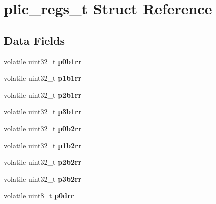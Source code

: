 \hypertarget{structplic__regs__t}{}\section{plic\+\_\+regs\+\_\+t Struct Reference}
\label{structplic__regs__t}
\subsection*{Data Fields}
\begin{DoxyCompactItemize}
\item 
\mbox{\label{structplic__regs__t_a11d0ebf6bcd208dee8c30186bed33289}} 
volatile uint32\+\_\+t {\bfseries p0b1rr}
\item 
\mbox{\label{structplic__regs__t_a218e6951e9af991fe6098fc0c5afd7f4}} 
volatile uint32\+\_\+t {\bfseries p1b1rr}
\item 
\mbox{\label{structplic__regs__t_afec47c1e18ef40f12915c30068b826e4}} 
volatile uint32\+\_\+t {\bfseries p2b1rr}
\item 
\mbox{\label{structplic__regs__t_ad572b292f64dbbf6ea5e4b2eacaf1780}} 
volatile uint32\+\_\+t {\bfseries p3b1rr}
\item 
\mbox{\label{structplic__regs__t_a80457071a6bdd95bf8012cc06993a74d}} 
volatile uint32\+\_\+t {\bfseries p0b2rr}
\item 
\mbox{\label{structplic__regs__t_a0aff89aef198ae55b5f23b808d134930}} 
volatile uint32\+\_\+t {\bfseries p1b2rr}
\item 
\mbox{\label{structplic__regs__t_a9ef3222a74976b3cc2c58b6d50f9dfa8}} 
volatile uint32\+\_\+t {\bfseries p2b2rr}
\item 
\mbox{\label{structplic__regs__t_ab266e8da42f6056bf7c6006c65c597af}} 
volatile uint32\+\_\+t {\bfseries p3b2rr}
\item 
\mbox{\label{structplic__regs__t_a26e81e9fe30417920255a89776bd6105}} 
volatile uint8\+\_\+t {\bfseries p0drr}
\item 

\end{DoxyCompactItemize}
